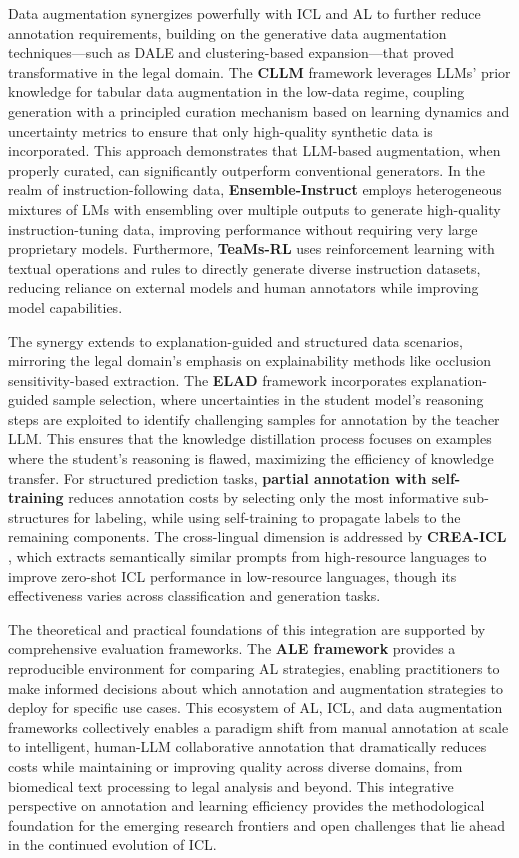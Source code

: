 \documentclass[11pt]{article}
\begin{document}
Data augmentation synergizes powerfully with ICL and AL to further reduce annotation requirements, building on the generative data augmentation techniques---such as DALE and clustering-based expansion---that proved transformative in the legal domain. The \textbf{CLLM} framework \cite{ref588} leverages LLMs' prior knowledge for tabular data augmentation in the low-data regime, coupling generation with a principled curation mechanism based on learning dynamics and uncertainty metrics to ensure that only high-quality synthetic data is incorporated. This approach demonstrates that LLM-based augmentation, when properly curated, can significantly outperform conventional generators. In the realm of instruction-following data, \textbf{Ensemble-Instruct} \cite{ref589} employs heterogeneous mixtures of LMs with ensembling over multiple outputs to generate high-quality instruction-tuning data, improving performance without requiring very large proprietary models. Furthermore, \textbf{TeaMs-RL} \cite{ref590} uses reinforcement learning with textual operations and rules to directly generate diverse instruction datasets, reducing reliance on external models and human annotators while improving model capabilities.

The synergy extends to explanation-guided and structured data scenarios, mirroring the legal domain's emphasis on explainability methods like occlusion sensitivity-based extraction. The \textbf{ELAD} framework \cite{ref591} incorporates explanation-guided sample selection, where uncertainties in the student model's reasoning steps are exploited to identify challenging samples for annotation by the teacher LLM. This ensures that the knowledge distillation process focuses on examples where the student's reasoning is flawed, maximizing the efficiency of knowledge transfer. For structured prediction tasks, \textbf{partial annotation with self-training} \cite{ref592} reduces annotation costs by selecting only the most informative sub-structures for labeling, while using self-training to propagate labels to the remaining components. The cross-lingual dimension is addressed by \textbf{CREA-ICL} \cite{ref536}, which extracts semantically similar prompts from high-resource languages to improve zero-shot ICL performance in low-resource languages, though its effectiveness varies across classification and generation tasks.

The theoretical and practical foundations of this integration are supported by comprehensive evaluation frameworks. The \textbf{ALE framework} \cite{ref593} provides a reproducible environment for comparing AL strategies, enabling practitioners to make informed decisions about which annotation and augmentation strategies to deploy for specific use cases. This ecosystem of AL, ICL, and data augmentation frameworks collectively enables a paradigm shift from manual annotation at scale to intelligent, human-LLM collaborative annotation that dramatically reduces costs while maintaining or improving quality across diverse domains, from biomedical text processing to legal analysis and beyond. This integrative perspective on annotation and learning efficiency provides the methodological foundation for the emerging research frontiers and open challenges that lie ahead in the continued evolution of ICL.
\end{document}
